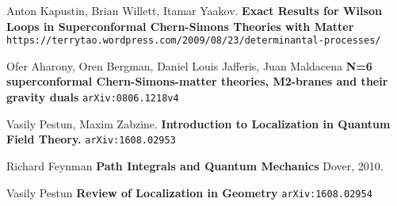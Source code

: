 \documentclass[12pt]{article}
\begin{document}
\begin{thebibliography}{}


\item Anton Kapustin, Brian Willett, Itamar Yaakov.  \textbf{Exact Results for Wilson Loops in Superconformal Chern-Simons Theories with Matter } \\ \texttt{https://terrytao.wordpress.com/2009/08/23/determinantal-processes/}

\item Ofer Aharony, Oren Bergman, Daniel Louis Jafferis, Juan Maldacena \textbf{N=6 superconformal Chern-Simons-matter theories, M2-branes and their gravity duals}
\texttt{arXiv:0806.1218v4}

\item Vasily Pestun, Maxim Zabzine. \textbf{Introduction to Localization in Quantum Field Theory.} \texttt{arXiv:1608.02953}

\item Richard Feynman \textbf{Path Integrals and Quantum Mechanics} Dover, 2010.

\item Vasily Pestun \textbf{Review of Localization in Geometry} \texttt{arXiv:1608.02954}


\end{thebibliography}
\end{document}
